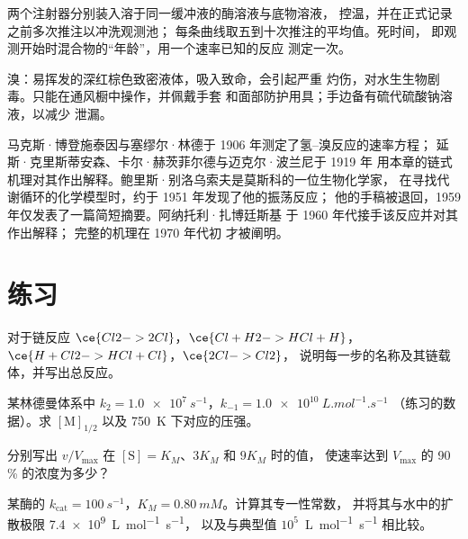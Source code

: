 \begin{inthelab}[停流法测量]
两个注射器分别装入溶于同一缓冲液的酶溶液与底物溶液，
控温，并在正式记录之前多次推注以冲洗观测池；
每条曲线取五到十次推注的平均值。死时间，
即观测开始时混合物的“年龄”，用一个速率已知的反应
测定一次。
\end{inthelab}

\begin{safety}{}
溴：易挥发的深红棕色致密液体，吸入致命，会引起严重
灼伤，对水生生物剧毒。只能在通风橱中操作，并佩戴手套
和面部防护用具；手边备有硫代硫酸钠溶液，以减少
泄漏。
\end{safety}

\begin{history}[博登施泰因与别洛乌索夫]
马克斯·博登施泰因与塞缪尔·林德于 1906 年测定了氢–溴反应的速率方程；
延斯·克里斯蒂安森、卡尔·赫茨菲尔德与迈克尔·波兰尼于 1919 年
用本章的链式机理对其作出解释。鲍里斯·别洛乌索夫是莫斯科的一位生物化学家，
在寻找代谢循环的化学模型时，约于 1951 年发现了他的振荡反应；
他的手稿被退回，1959 年仅发表了一篇简短摘要。阿纳托利·扎博廷斯基
于 1960 年代接手该反应并对其作出解释；
完整的机理在 1970 年代初
才被阐明。
\end{history}

\section{练习}

\begin{exercise}[$\star$]\label{exo:b3:complex-kinetics:1}
对于链反应 $\ce{Cl2 -> 2 Cl}$，$\ce{Cl + H2 -> HCl + H}$，$\ce{H + Cl2 -> HCl + Cl}$，$\ce{2 Cl -> Cl2}$，
说明每一步的名称及其链载体，并写出总反应。
\end{exercise}

\begin{exercise}[$\star$]\label{exo:b3:complex-kinetics:2}
某林德曼体系中 $k_2 = \qty{1.0e7}{s^{-1}}$，$k_{-1} = \qty{1.0e10}{L.mol^{-1}.s^{-1}}$
（练习的数据）。求 $[\mathrm M]_{1/2}$ 以及 \qty{750}{K} 下对应的压强。
\end{exercise}

\begin{exercise}[$\star$]\label{exo:b3:complex-kinetics:3}
分别写出 $v/V_{\max}$ 在 $[\mathrm S] = K_M$、$3K_M$ 和 $9K_M$ 时的值，
使速率达到 $V_{\max}$ 的 90\,\% 的浓度为多少？
\end{exercise}

\begin{exercise}[$\star$]\label{exo:b3:complex-kinetics:4}
某酶的 $k_{\mathrm{cat}} = \qty{100}{s^{-1}}$，$K_M = \qty{0.80}{mM}$。计算其专一性常数，
并将其与水中的扩散极限 \qty{7.4e9}{L.mol^{-1}.s^{-1}}，
以及与典型值 $10^5$~\unit{L.mol^{-1}.s^{-1}} 相比较。
\end{exercise}

